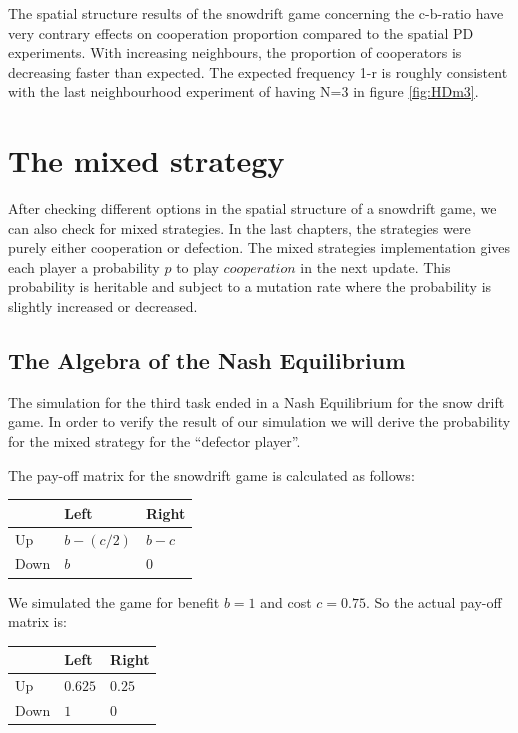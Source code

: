 \documentclass[DIV=calc, paper=a4, fontsize=11pt, twocolumn]{scrartcl}	 %
\begin{document}
The spatial structure results of the snowdrift game concerning the c-b-ratio have very contrary effects on cooperation proportion compared to the spatial PD experiments. With increasing neighbours, the proportion of cooperators is decreasing faster than expected. The expected frequency 1-r is roughly consistent with the last neighbourhood experiment of having N=3 in figure \ref{fig:HDm3}.  \\

\section*{The mixed strategy}

After checking different options in the spatial structure of a snowdrift game, we can also check for mixed strategies. In the last chapters, the strategies were purely either cooperation or defection. The mixed strategies implementation gives each player a probability $p$ to play $cooperation$ in the next update. This probability is heritable and subject to a mutation rate where the probability is slightly increased or decreased. \\



\subsection*{The Algebra of the Nash Equilibrium}

The simulation for the third task ended in a Nash Equilibrium
for the snow drift game. In order to verify the result of our
simulation we will derive the probability for the mixed strategy
for the ``defector player''.

The pay-off matrix for the snowdrift game is calculated as follows:\\

\begin{tabular}{l|ll}
  & Left & Right \\
\midrule
Up & $b-(c/2)$ & $b-c$ \\
Down & $b$ & $0$ \\
\end{tabular}

We simulated the game for benefit $b=1$ and cost $c=0.75$.
So the actual pay-off matrix is:\\

\begin{tabular}{l|ll}
  & Left & Right \\
\midrule
Up & $0.625$ & $0.25$ \\
Down & $1$ & $0$ \\
\end{tabular}
\end{document}
